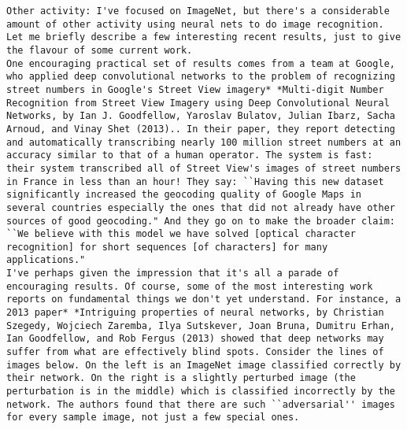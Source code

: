 \begin{lstlisting}
Other activity: I've focused on ImageNet, but there's a considerable amount of other activity using neural nets to do image recognition. Let me briefly describe a few interesting recent results, just to give the flavour of some current work.
One encouraging practical set of results comes from a team at Google, who applied deep convolutional networks to the problem of recognizing street numbers in Google's Street View imagery* *Multi-digit Number Recognition from Street View Imagery using Deep Convolutional Neural Networks, by Ian J. Goodfellow, Yaroslav Bulatov, Julian Ibarz, Sacha Arnoud, and Vinay Shet (2013).. In their paper, they report detecting and automatically transcribing nearly 100 million street numbers at an accuracy similar to that of a human operator. The system is fast: their system transcribed all of Street View's images of street numbers in France in less than an hour! They say: ``Having this new dataset significantly increased the geocoding quality of Google Maps in several countries especially the ones that did not already have other sources of good geocoding." And they go on to make the broader claim: ``We believe with this model we have solved [optical character recognition] for short sequences [of characters] for many applications."
I've perhaps given the impression that it's all a parade of encouraging results. Of course, some of the most interesting work reports on fundamental things we don't yet understand. For instance, a 2013 paper* *Intriguing properties of neural networks, by Christian Szegedy, Wojciech Zaremba, Ilya Sutskever, Joan Bruna, Dumitru Erhan, Ian Goodfellow, and Rob Fergus (2013) showed that deep networks may suffer from what are effectively blind spots. Consider the lines of images below. On the left is an ImageNet image classified correctly by their network. On the right is a slightly perturbed image (the perturbation is in the middle) which is classified incorrectly by the network. The authors found that there are such ``adversarial'' images for every sample image, not just a few special ones.


\end{lstlisting}
